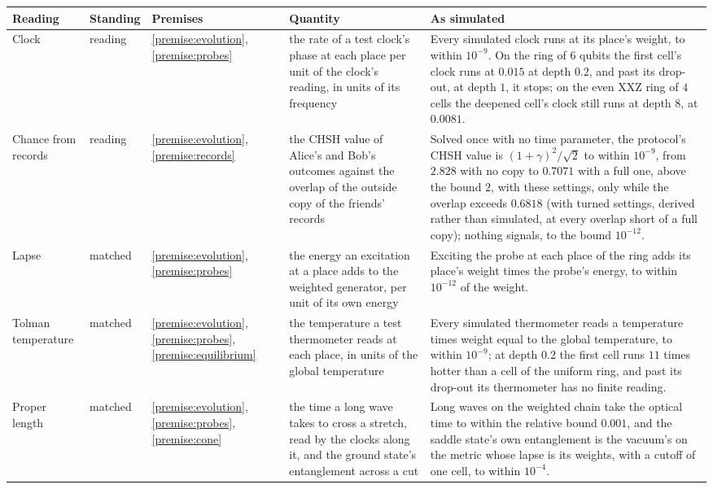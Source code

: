 \begin{tabular}{p{1.0in}llp{2.1in}p{2.8in}}
\toprule
\raggedright Reading & Standing & Premises & \raggedright Quantity & \raggedright As simulated \tabularnewline
\midrule
\raggedright Clock & reading & \ref{premise:evolution}, \ref{premise:probes} & \raggedright the rate of a test clock's phase at each place per unit of the clock's reading, in units of its frequency & \raggedright Every simulated clock runs at its place's weight, to within $10^{-9}$. On the ring of $6$ qubits the first cell's clock runs at $0.015$ at depth $0.2$, and past its drop-out, at depth $1$, it stops; on the even XXZ ring of $4$ cells the deepened cell's clock still runs at depth $8$, at $0.0081$. \tabularnewline
\raggedright Chance from records & reading & \ref{premise:evolution}, \ref{premise:records} & \raggedright the CHSH value of Alice's and Bob's outcomes against the overlap of the outside copy of the friends' records & \raggedright Solved once with no time parameter, the protocol's CHSH value is $(1+\gamma)^2/\sqrt{2}$ to within $10^{-9}$, from $2.828$ with no copy to $0.7071$ with a full one, above the bound $2$, with these settings, only while the overlap exceeds $0.6818$ (with turned settings, derived rather than simulated, at every overlap short of a full copy); nothing signals, to the bound $10^{-12}$. \tabularnewline
\raggedright Lapse & matched & \ref{premise:evolution}, \ref{premise:probes} & \raggedright the energy an excitation at a place adds to the weighted generator, per unit of its own energy & \raggedright Exciting the probe at each place of the ring adds its place's weight times the probe's energy, to within $10^{-12}$ of the weight. \tabularnewline
\raggedright Tolman temperature & matched & \ref{premise:evolution}, \ref{premise:probes}, \ref{premise:equilibrium} & \raggedright the temperature a test thermometer reads at each place, in units of the global temperature & \raggedright Every simulated thermometer reads a temperature times weight equal to the global temperature, to within $10^{-9}$; at depth $0.2$ the first cell runs $11$ times hotter than a cell of the uniform ring, and past its drop-out its thermometer has no finite reading. \tabularnewline
\raggedright Proper length & matched & \ref{premise:evolution}, \ref{premise:probes}, \ref{premise:cone} & \raggedright the time a long wave takes to cross a stretch, read by the clocks along it, and the ground state's entanglement across a cut & \raggedright Long waves on the weighted chain take the optical time to within the relative bound $0.001$, and the saddle state's own entanglement is the vacuum's on the metric whose lapse is its weights, with a cutoff of one cell, to within $10^{-4}$. \tabularnewline

\end{tabular}
